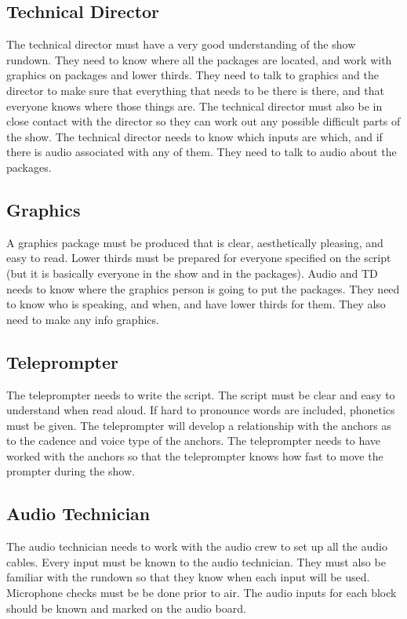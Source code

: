 \documentclass[letterpaper,10pt,oneside]{article}
\begin{document}
\subsection{Technical Director}
The technical director must have a very good understanding of the show rundown. They need to know where all the packages are located, and work with graphics on packages and lower thirds. They need to talk to graphics and the director to make sure that everything that needs to be there is there, and that everyone knows where those things are. The technical director must also be in close contact with the director so they can work out any possible difficult parts of the show. The technical director needs to know which inputs are which, and if there is audio associated with any of them. They need to talk to audio about the packages.

\subsection{Graphics}
A graphics package must be produced that is clear, aesthetically pleasing, and easy to read. Lower thirds must be prepared for everyone specified on the script (but it is basically everyone in the show and in the packages). Audio and TD needs to know where the graphics person is going to put the packages. They need to know who is speaking, and when, and have lower thirds for them. They also need to make any info graphics.

\subsection{Teleprompter}
The teleprompter needs to write the script. The script must be clear and easy to understand when read aloud. If hard to pronounce words are included, phonetics must be given. The teleprompter will develop a relationship with the anchors as to the cadence and voice type of the anchors. The teleprompter needs to have worked with the anchors so that the teleprompter knows how fast to move the prompter during the show.

\subsection{Audio Technician}
The audio technician needs to work with the audio crew to set up all the audio cables. Every input must be known to the audio technician. They must also be familiar with the rundown so that they know when each input will be used. Microphone checks must be be done prior to air. The audio inputs for each block should be known and marked on the audio board.
\end{document}
